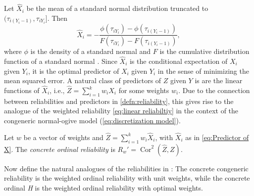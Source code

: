 \documentclass[twoside]{article}
\DeclareMathOperator{\Cor}{Cor}
\begin{document}
Let $\hat{X}_{i}$ be the mean of a standard normal distribution
truncated to $(\tau_{i(Y_{i}-1)},\tau_{iY_{i}}]$. Then
\begin{equation}
\hat{X}_{i}=-\frac{\phi(\tau_{iY_{i}})-\phi(\tau_{i(Y_{i}-1)})}{F(\tau_{iY_{i}})-F(\tau_{i(Y_{i}-1)})},\label{eq:Predictor of X}
\end{equation}
where $\phi$ is the density of a standard normal and $F$ is the cumulative distribution function of a standard normal \citep[Section 10.1]{Johnson1994-ag}. Since $\hat{X}_{i}$ is the
conditional expectation of $X_{i}$ given $Y_{i}$, it is the optimal
predictor of $X_{i}$ given $Y_{i}$ in the sense of minimizing the
mean squared error. A natural class of predictors of $Z$ given $Y$ is are the linear
functions of $\hat{X}_{i}$, i.e., $\hat{Z} = \sum_{i=1}^{k}w_{i}\hat{X}_{i}$
for some weights $w_{i}$. Due to the connection between reliabilities and predictors in \cref{defn:reliability}, this gives rise to the analogue of the
weighted reliability \eqref{eq:linear reliabiltiy} in the context of the congeneric normal-ogive model
(\ref{eq:discretization model}).
\begin{defn}\label{defn:concrete ordinal reliability}
Let $w$ be a vector of weights and $\hat{Z}=\sum_{i=1}^{k}w_{i}\hat{X}_{i}$, with $\hat{X}_i$ as in \eqref{eq:Predictor of X}. The \textit{concrete ordinal reliability} is $ R_{w}'=\Cor^2(\hat{Z},Z)$.
\end{defn}
Now define the natural analogues of the reliabilities in : The concrete congeneric reliability is the weighted ordinal reliability with unit weights, while the concrete ordinal \textit{H} is the weighted ordinal reliability with optimal weights.  
\end{document}
